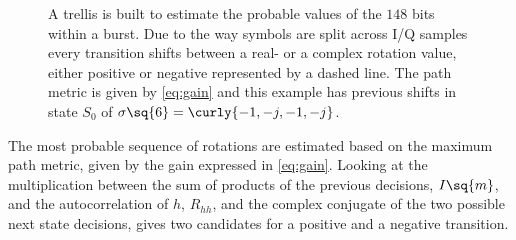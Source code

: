 \begin{figure}
  \centering
  \caption{A trellis is built to estimate the probable values of the
    $148$ bits within a burst. Due to the way symbols are split across
    \gls{I}/\gls{Q} samples every transition shifts between a real- or
    a complex rotation value, either positive or negative represented
    by a dashed line. The path metric is given by \cref{eq:gain} and
    this example has previous shifts in state $S_0$ of $\sigma \sq{6}
    = \curly{-1, -j, -1, -j}$.}
  \label{fig:viterbi_detector_trellis}
\end{figure}

The most probable sequence of rotations are estimated based on the
maximum path metric, given by the gain expressed in
\cref{eq:gain}. Looking at the multiplication between the sum of
products of the previous decisions, $I \sq{m}$, and the
autocorrelation of $h$, $R_{hh}$, and the complex conjugate of the two
possible next state decisions, gives two candidates for a positive and
a negative transition.

